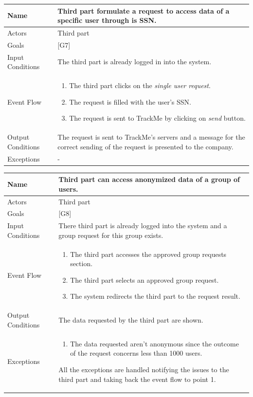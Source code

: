 \documentclass{article}
\begin{document}
\begin{center}
    \begin{tabular}{ | l | p{10cm} |}
    \hline
    Name & Third part formulate a request to access data of a specific user through is SSN. \\ \hline
    Actors & Third part\\ \hline
   	Goals & {[G7]}\\ \hline
    Input Conditions & The third part is already logged in into the system.\\ \hline
    Event Flow & \begin{enumerate}
    	\item The third part clicks on the \emph{single user request}.
    	\item The request is filled with the user's SSN.
    	\item The request is sent to TrackMe by clicking on \emph{send} button. 
    \end{enumerate} \\ \hline
    Output Conditions & The request is sent to TrackMe's servers and a message for the correct sending of the request is presented to the company.  \\ \hline
    Exceptions & -    \\ \hline
    \end{tabular}
\end{center}

\begin{center}
    \begin{tabular}{ | l | p{10cm} |}
    \hline
    Name & Third part can access anonymized data of a group of users.\\ \hline
    Actors & Third part\\ \hline
   	Goals & {[G8]}\\ \hline
    Input Conditions & There third part is already logged into the system and a group request for this group exists.\\ \hline
    Event Flow & \begin{enumerate}
    	\item The third part accesses the approved group requests section.
		\item The third part selects an approved group request.
		\item The system redirects the third part to the request result.
    \end{enumerate} \\ \hline
    Output Conditions & The data requested by the third part are shown.  \\ \hline
    Exceptions & \begin{enumerate}
  		\item The data requested aren't anonymous since the outcome of the request concerns less than 1000 users.
\end{enumerate} All the exceptions are handled notifying the issues to the third part and taking back the event flow to point 1.    \\ \hline
    \end{tabular}
\end{center}
\end{document}
